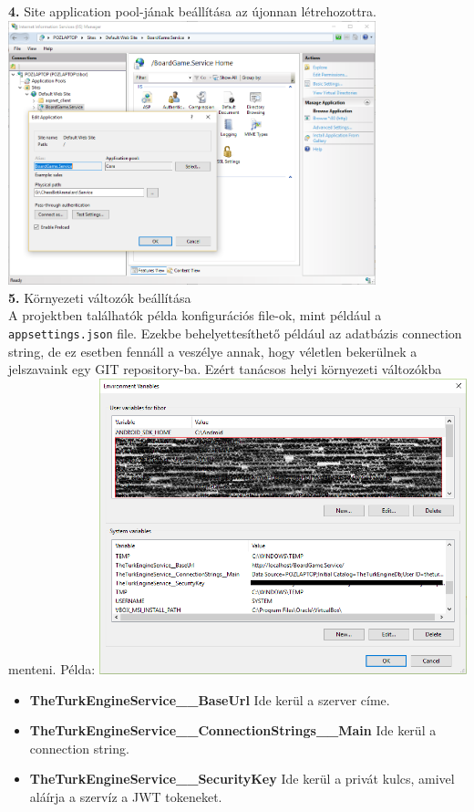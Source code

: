 \documentclass[twoside, a4paper, 12pt]{article}
\begin{document}
\noindent \textbf{4.} Site application pool-jának beállítása az újonnan létrehozottra.
\includegraphics[width=0.8\textwidth]{img/server_dev_run_3.png} \\

\noindent \textbf{5.} Környezeti változók beállítása \\
A projektben találhatók példa konfigurációs file-ok, mint például a \texttt{appsettings.json} file. Ezekbe behelyettesíthető például az adatbázis connection string, de ez esetben fennáll a veszélye annak, hogy véletlen bekerülnek a jelszavaink egy GIT repository-ba. Ezért tanácsos helyi környezeti változókba menteni. Példa:
\includegraphics[width=0.8\textwidth]{img/server_dev_run_4.png}
\begin{itemize}
	\item \textbf{TheTurkEngineService\_\_BaseUrl} Ide kerül a szerver címe.
	\item \textbf{TheTurkEngineService\_\_ConnectionStrings\_\_Main} Ide kerül a connection string.
	\item \textbf{TheTurkEngineService\_\_SecurityKey} Ide kerül a privát kulcs, amivel aláírja a szervíz a JWT tokeneket.
\end{itemize}
\end{document}
